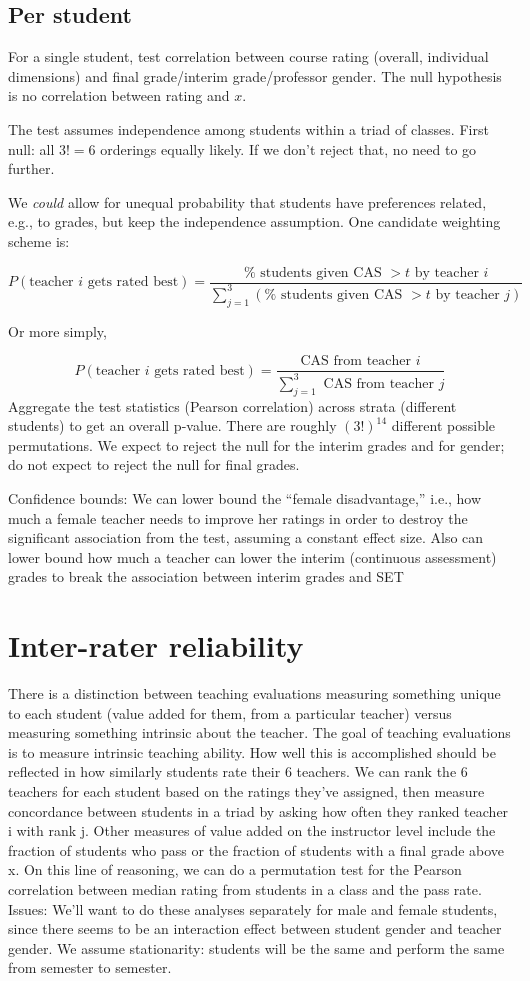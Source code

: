\documentclass[12pt]{article}
\begin{document}
\subsection{Per student}
For a single student, test correlation between course rating (overall, individual dimensions) and final grade/interim grade/professor gender.
The null hypothesis is no correlation between rating and $x$.

The test assumes independence among students within a triad of classes.
First null: all $3! = 6$ orderings equally likely.
If we don't reject that, no need to go further.

We \emph{could} allow for unequal probability that students have preferences
related, e.g., to grades, but keep the independence assumption.
One candidate weighting scheme is:

$$P(\text{teacher $i$ gets rated best}) = \frac{\%\text{ students given CAS }> t\text{ by teacher $i$}}{\sum_{j=1}^3(\%\text{ students given CAS }> t\text{ by teacher }j)}$$
 
Or more simply, 

$$P(\text{teacher $i$ gets rated best}) = \frac{\text{CAS from teacher $i$}}{\sum_{j=1}^3\text{ CAS from teacher }j}$$
Aggregate the test statistics (Pearson correlation) across strata (different students) to get an overall p-value.  There are roughly $(3!)^{14}$ different possible permutations.
We expect to reject the null for the interim grades and for gender; do not expect to reject the null for final grades.
 
Confidence bounds:
We can lower bound the ``female disadvantage,'' i.e., 
how much a female teacher needs to improve her ratings in order to destroy the 
significant association from the test, assuming a constant effect size.
Also can lower bound how much a teacher can lower the interim (continuous assessment) grades to break the association between interim grades and SET

\section{Inter-rater reliability}
There is a distinction between teaching evaluations measuring something unique to each student 
(value added for them, from a particular teacher) versus 
measuring something intrinsic about the teacher.  
The goal of teaching evaluations is to measure intrinsic teaching ability.  
How well this is accomplished should be reflected in how similarly 
students rate their 6 teachers.
We can rank the 6 teachers for each student based on the ratings 
they've assigned, then measure concordance between students in a triad by asking how often they ranked teacher i with rank j.
Other measures of value added on the instructor level include the fraction of 
students who pass or the fraction of students with a final grade above x.  
On this line of reasoning, we can do a permutation test for the 
Pearson correlation between median rating from students in a class and the pass rate.
Issues:
We'll want to do these analyses separately for male and female students, 
since there seems to be an interaction effect between student gender and teacher gender.
We assume stationarity: students will be the same and perform the same from semester to semester.
\end{document}
